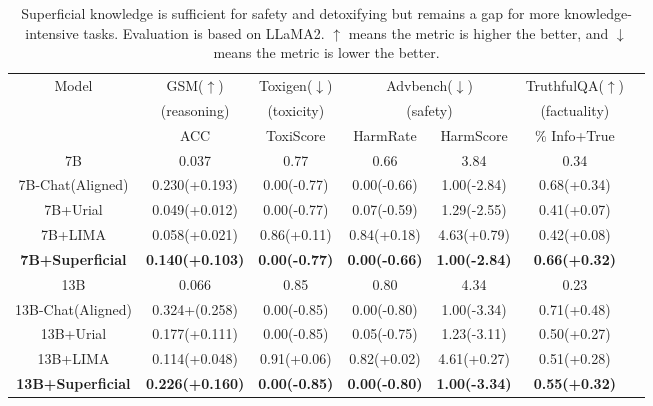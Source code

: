 \begin{table*}[t]

\begin{center}

\begin{tabular}{ccccccc}
\toprule
\multirow{3}{*}{Model} & GSM($\uparrow$) & Toxigen($\downarrow$) & \multicolumn{2}{c}{Advbench($\downarrow$)} & TruthfulQA($\uparrow$)  \\
  ~ & (reasoning) & (toxicity) &  \multicolumn{2}{c}{(safety)} &  (factuality) \\
~&ACC & ToxiScore & HarmRate & HarmScore & \% Info+True \\
\midrule
 7B                   & 0.037         & 0.77        & 0.66        &          3.84        & 0.34 \\
7B-Chat(Aligned)  & 0.230(+0.193) & 0.00(-0.77) & 0.00(-0.66) & 1.00(-2.84) & 0.68(+0.34) \\
 7B+Urial           & 0.049(+0.012) & 0.00(-0.77) & 0.07(-0.59) & 1.29(-2.55) & 0.41(+0.07) \\
 7B+LIMA           & 0.058(+0.021) &  0.86(+0.11) & 0.84(+0.18) & 4.63(+0.79) & 0.42(+0.08) \\
 \textbf{7B+Superficial}        & \textbf{0.140(+0.103)} & \textbf{0.00(-0.77)} & \textbf{0.00(-0.66)} & \textbf{1.00(-2.84)} & \textbf{0.66(+0.32)} \\
\midrule
 13B  & 0.066         & 0.85        & 0.80        & 4.34 & 0.23 \\
 13B-Chat(Aligned)                       & 0.324+(0.258) & 0.00(-0.85) & 0.00(-0.80) & 1.00(-3.34) & 0.71(+0.48) \\
 13B+Urial                           & 0.177(+0.111) & 0.00(-0.85) & 0.05(-0.75) & 1.23(-3.11) & 0.50(+0.27) \\
13B+LIMA                           & 0.114(+0.048) & 0.91(+0.06) & 0.82(+0.02) & 4.61(+0.27) & 0.51(+0.28) \\
  \textbf{13B+Superficial}        & \textbf{0.226(+0.160)} & \textbf{0.00(-0.85)} & \textbf{0.00(-0.80)} & \textbf{1.00(-3.34)} & \textbf{0.55(+0.32)} \\
\bottomrule
\end{tabular}
\end{center}
\caption{ Superficial knowledge is sufficient for safety and detoxifying but remains a gap for more knowledge-intensive tasks. Evaluation is based on LLaMA2. $\uparrow$ means the metric is higher the better, and $\downarrow$ means the metric is lower the better.}\label{tab:ana7}
\end{table*}


